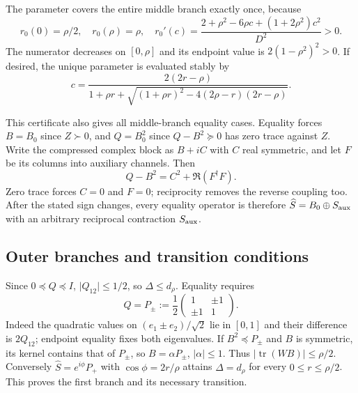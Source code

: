 \documentclass[11pt,a4paper]{article}
\theoremstyle{remark}
\newcommand{\abs}[1]{\lvert #1\rvert}
\newcommand{\tr}{\operatorname{tr}}
\begin{document}
The parameter covers the entire middle branch exactly once, because
\[
 r_0(0)=\rho/2,\quad r_0(\rho)=\rho,\quad
 r_0'(c)=\frac{2+\rho^2-6\rho c+(1+2\rho^2)c^2}{D^2}>0.
\]
The numerator decreases on $[0,\rho]$ and its endpoint value is $2(1-\rho^2)^2>0$. If desired, the unique parameter is evaluated stably by
\[
 c=\frac{2(2r-\rho)}{1+\rho r+\sqrt{(1+\rho r)^2-4(2\rho-r)(2r-\rho)}}.
\]

This certificate also gives all middle-branch equality cases. Equality forces $B=B_0$ since $Z\succ0$, and $Q=B_0^2$ since $Q-B^2\succeq0$ has zero trace against $Z$. Write the compressed complex block as $B+iC$ with $C$ real symmetric, and let $F$ be its columns into auxiliary channels. Then
\[
 Q-B^2=C^2+\Re(F^\dagger F).
\]
Zero trace forces $C=0$ and $F=0$; reciprocity removes the reverse coupling too. After the stated sign changes, every equality operator is therefore $\widehat S=B_0\oplus S_{\rm aux}$ with an arbitrary reciprocal contraction $S_{\rm aux}$.

\subsection{Outer branches and transition conditions}
Since $0\preceq Q\preceq I$, $\abs{Q_{12}}\leq1/2$, so $\Delta\leq d_\rho$. Equality requires
\[
 Q=P_\pm:=\frac12\begin{pmatrix}1&\pm1\\\pm1&1\end{pmatrix}.
\]
Indeed the quadratic values on $(e_1\pm e_2)/\sqrt2$ lie in $[0,1]$ and their difference is $2Q_{12}$; endpoint equality fixes both eigenvalues. If $B^2\preceq P_\pm$ and $B$ is symmetric, its kernel contains that of $P_\pm$, so $B=\alpha P_\pm$, $\abs\alpha\leq1$. Thus $\abs{\tr(WB)}\leq\rho/2$. Conversely $\widehat S=e^{i\phi}P_+$ with $\cos\phi=2r/\rho$ attains $\Delta=d_\rho$ for every $0\leq r\leq\rho/2$. This proves the first branch and its necessary transition.
\end{document}
